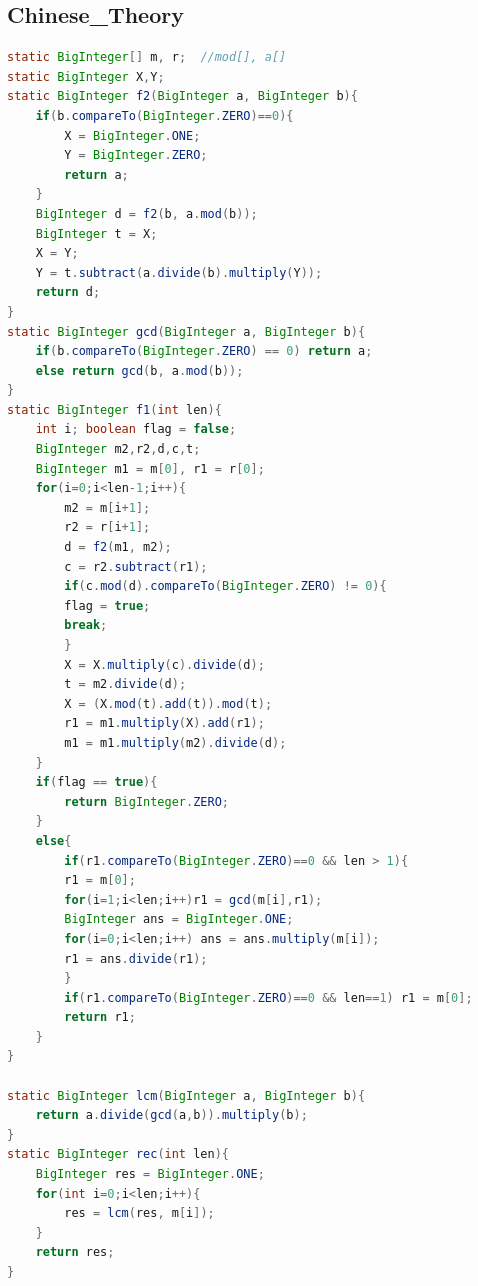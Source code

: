 \documentclass[a4paper]{article}
\begin{document}
\begin{CJK*}{UTF8}{gbsn}
\begin{multicols}{3}
\begin{flushleft}
\subsection{Chinese\_Theory}
\begin{lstlisting}[language={Java}]
static BigInteger[] m, r;  //mod[], a[]
static BigInteger X,Y;
static BigInteger f2(BigInteger a, BigInteger b){
	if(b.compareTo(BigInteger.ZERO)==0){
	    X = BigInteger.ONE;
	    Y = BigInteger.ZERO;
	    return a;
	}
	BigInteger d = f2(b, a.mod(b));
	BigInteger t = X;
	X = Y;
	Y = t.subtract(a.divide(b).multiply(Y));
	return d;
}
static BigInteger gcd(BigInteger a, BigInteger b){
	if(b.compareTo(BigInteger.ZERO) == 0) return a;
	else return gcd(b, a.mod(b));
}
static BigInteger f1(int len){
	int i; boolean flag = false;
	BigInteger m2,r2,d,c,t;
	BigInteger m1 = m[0], r1 = r[0];
	for(i=0;i<len-1;i++){
	    m2 = m[i+1];
	    r2 = r[i+1];
	    d = f2(m1, m2);
	    c = r2.subtract(r1);
	    if(c.mod(d).compareTo(BigInteger.ZERO) != 0){
		flag = true;
		break;
	    }
	    X = X.multiply(c).divide(d);
	    t = m2.divide(d);
	    X = (X.mod(t).add(t)).mod(t);
	    r1 = m1.multiply(X).add(r1);
	    m1 = m1.multiply(m2).divide(d);
	}
	if(flag == true){
	    return BigInteger.ZERO;
	}
	else{
	    if(r1.compareTo(BigInteger.ZERO)==0 && len > 1){
		r1 = m[0];
		for(i=1;i<len;i++)r1 = gcd(m[i],r1);
		BigInteger ans = BigInteger.ONE;
		for(i=0;i<len;i++) ans = ans.multiply(m[i]);
		r1 = ans.divide(r1);
	    }
	    if(r1.compareTo(BigInteger.ZERO)==0 && len==1) r1 = m[0];
	    return r1;
	}
}

static BigInteger lcm(BigInteger a, BigInteger b){
	return a.divide(gcd(a,b)).multiply(b);
}
static BigInteger rec(int len){
	BigInteger res = BigInteger.ONE;
	for(int i=0;i<len;i++){
	    res = lcm(res, m[i]);
	}
	return res;
}
\end{lstlisting}



\end{flushleft}
\end{multicols}
\end{CJK*}
\end{document}
